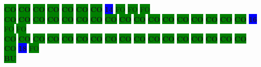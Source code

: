 \colorbox{green}{\color[rgb]{0,0,0}\textbf{CO}}%
\colorbox{green}{\color[rgb]{0,0,0}\textbf{CO}}%
\colorbox{green}{\color[rgb]{0,0,0}\textbf{CO}}%
\colorbox{green}{\color[rgb]{0,0,0}\textbf{CO}}%
\colorbox{green}{\color[rgb]{0,0,0}\textbf{CO}}%
\colorbox{green}{\color[rgb]{0,0,0}\textbf{CO}}%
\colorbox{green}{\color[rgb]{0,0,0}\textbf{CO}}%
\colorbox{blue}{\color[rgb]{1,0,0}\textbf{14}}%
\colorbox{green}{\color[gray]{0.75}FO}%
\colorbox{green}{\color[gray]{0.75}FO}%
\colorbox{green}{\color[gray]{0.75}FO}%
\\
\colorbox{green}{\color[rgb]{0,0,0}\textbf{CO}}%
\colorbox{green}{\color[rgb]{0,0,0}\textbf{CO}}%
\colorbox{green}{\color[rgb]{0,0,0}\textbf{CO}}%
\colorbox{green}{\color[rgb]{0,0,0}\textbf{CO}}%
\colorbox{green}{\color[rgb]{0,0,0}\textbf{CO}}%
\colorbox{green}{\color[rgb]{0,0,0}\textbf{CO}}%
\colorbox{green}{\color[rgb]{0,0,0}\textbf{CO}}%
\colorbox{green}{\color[rgb]{0,0,0}\textbf{CO}}%
\colorbox{green}{\color[rgb]{0,0,0}\textbf{CO}}%
\colorbox{green}{\color[rgb]{0,0,0}\textbf{CO}}%
\colorbox{green}{\color[rgb]{0,0,0}\textbf{CO}}%
\colorbox{green}{\color[rgb]{0,0,0}\textbf{CO}}%
\colorbox{green}{\color[rgb]{0,0,0}\textbf{CO}}%
\colorbox{green}{\color[rgb]{0,0,0}\textbf{CO}}%
\colorbox{green}{\color[rgb]{0,0,0}\textbf{CO}}%
\colorbox{green}{\color[rgb]{0,0,0}\textbf{CO}}%
\colorbox{green}{\color[rgb]{0,0,0}\textbf{CO}}%
\colorbox{blue}{\color[rgb]{1,0,0}\textbf{16}}%
\colorbox{green}{\color[gray]{0.75}FO}%
\colorbox{green}{\color[gray]{0.75}FO}%
\\
\colorbox{green}{\color[rgb]{0,0,0}\textbf{CO}}%
\colorbox{green}{\color[rgb]{0,0,0}\textbf{CO}}%
\colorbox{green}{\color[rgb]{0,0,0}\textbf{CO}}%
\colorbox{green}{\color[rgb]{0,0,0}\textbf{CO}}%
\colorbox{green}{\color[rgb]{0,0,0}\textbf{CO}}%
\colorbox{green}{\color[rgb]{0,0,0}\textbf{CO}}%
\colorbox{green}{\color[rgb]{0,0,0}\textbf{CO}}%
\colorbox{green}{\color[rgb]{0,0,0}\textbf{CO}}%
\colorbox{green}{\color[rgb]{0,0,0}\textbf{CO}}%
\colorbox{green}{\color[rgb]{0,0,0}\textbf{CO}}%
\colorbox{green}{\color[rgb]{0,0,0}\textbf{CO}}%
\colorbox{green}{\color[rgb]{0,0,0}\textbf{CO}}%
\colorbox{green}{\color[rgb]{0,0,0}\textbf{CO}}%
\colorbox{green}{\color[rgb]{0,0,0}\textbf{CO}}%
\colorbox{green}{\color[rgb]{0,0,0}\textbf{CO}}%
\colorbox{green}{\color[rgb]{0,0,0}\textbf{CO}}%
\colorbox{green}{\color[rgb]{0,0,0}\textbf{CO}}%
\colorbox{green}{\color[rgb]{0,0,0}\textbf{CO}}%
\colorbox{blue}{\color[rgb]{1,0,0}\textbf{18}}%
\colorbox{green}{\color[gray]{0.75}FO}%
\\
\colorbox{green}{\color[rgb]{1,0,0}\textbf{BU}}%
